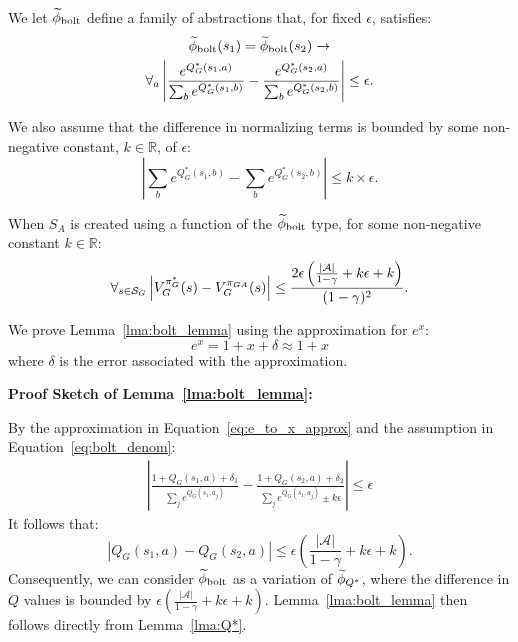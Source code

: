 \bdefn{$\epB$}
We let $\epB$ define a family of abstractions that, for fixed $\epsilon$, satisfies:
\begin{multline}
\widetilde \phi_{\text{bolt}}(s_1) = \widetilde \phi_{\text{bolt}}(s_2) \rightarrow \\
\forall_{a} \left|\frac{e^{Q_G^*(s_1,a)}}{\sum_b e^{Q_G^*(s_1,b)}} - \frac{e^{Q_G^*(s_2,a)}}{\sum_b e^{Q_G^*(s_2,b)}}\right| \leq \epsilon.
\label{eq:phi_bolt}
\end{multline}
\edefn
{}

We also assume that the difference in normalizing terms is bounded by some non-negative constant, $k\in \mathbb{R}$, of $\epsilon$:
\begin{equation}
\left| \sum_b e^{Q_G^*(s_1,b)} - \sum_b e^{Q_G^*(s_2,b)} \right| \leq k\times\epsilon.
\label{eq:bolt_denom}
\end{equation}
\begin{lma} When $S_A$ is created using a function of the $\epB$ type, for some non-negative constant $k \in \mathbb{R}$:
\begin{equation}
\forall_{s \in \mathcal{S}_G} \left| V_G^{\pi^*_G}(s) - V_G^{\pi_{GA}}(s) \right| \leq \frac{2\epsilon\left(\frac{|\mathcal{A}|}{1-\gamma} + k\epsilon + k\right)}{(1-\gamma)^2}.
\end{equation}
\label{lma:bolt_lemma}
\end{lma}
We prove Lemma~\ref{lma:bolt_lemma} using the approximation for $e^x$:
\begin{equation}
 e^x = 1 + x + \delta  \approx 1 + x
\label{eq:e_to_x_approx}
\end{equation}
where $\delta$ is the error associated with the approximation.

{\bf Proof Sketch of Lemma~\ref{lma:bolt_lemma}:}

By the approximation in Equation~\ref{eq:e_to_x_approx} and the assumption in Equation~\ref{eq:bolt_denom}:
\begin{align*}
\left|\frac{1 + Q_G(s_1,a) + \delta_1}{\sum_j e^{Q_G(s_1,a_j)}} - \frac{1 + Q_G(s_2,a) + \delta_2}{\sum_j e^{Q_G(s_1,a_j)} \pm k\epsilon}\right| \leq \epsilon
\end{align*}
It follows that:
\begin{equation}
\left|Q_G(s_1,a) - Q_G(s_2,a)\right| \leq \epsilon \left(\frac{|\mathcal{A}|}{1-\gamma} + k\epsilon + k \right).
\label{eq:bolt_qs}
\end{equation}
Consequently, we can consider $\epB$ as a variation of $\widetilde \phi_{Q^*}$, where the difference in $Q$ values is bounded by $\epsilon \left(\frac{|\mathcal{A}|}{1-\gamma} + k\epsilon + k \right)$. Lemma~\ref{lma:bolt_lemma} then follows directly from Lemma~\ref{lma:Q*}.

